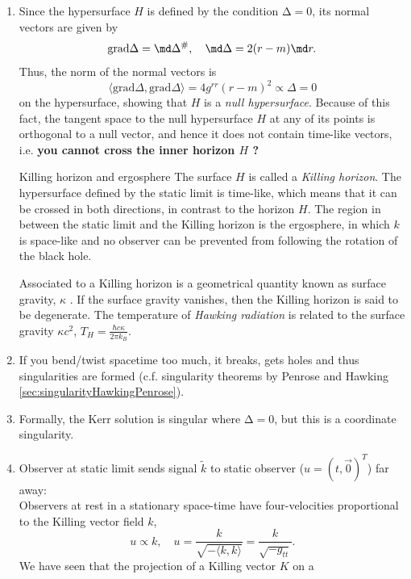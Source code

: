 \begin{enumerate}
	 \item Since the hypersurface $H$ is defined by the condition $∆ = 0$, its normal
	 vectors are given by
	 \begin{equation}
	 	\mathrm{grad} \Delta = \md \Delta^{\#}, \quad \md \Delta = 2(r-m) \md r.
	 \end{equation}
Thus, the norm of the normal vectors is 
\begin{equation}
 	\langle \mathrm{grad} \Delta, \mathrm{grad} \Delta \rangle = 4 g^{rr} (r-m)^2 \propto \Delta = 0
\end{equation}
on the hypersurface, showing that $H$ is a \emph{null hypersurface}. Because of this fact, the tangent space to
the null hypersurface $H$ at any of its points is orthogonal to a null vector,
and hence it does not contain time-like vectors, i.e. \textbf{you cannot cross the inner horizon $H$ ?}
\begin{mybox}{Killing horizon and ergosphere}
	The surface $H$ is called a \emph{Killing horizon}. The hypersurface defined
	by the static limit is time-like, which means that it can be crossed in
	both directions, in contrast to the horizon $H$. The region in between
	the static limit and the Killing horizon is the ergosphere, in which $k$ is
	space-like and no observer can be prevented from following the rotation
	of the black hole.
\end{mybox}
Associated to a Killing horizon is a geometrical quantity known as surface gravity, $\kappa$ . If the surface gravity vanishes, then the Killing horizon is said to be degenerate. The temperature of \emph{Hawking radiation} is related to the surface gravity $\kappa c^2$, $T_H=\frac {\hbar c\kappa }{2\pi k_{B}}$.
\item If you bend/twist spacetime too much, it breaks, gets holes and thus singularities are formed (c.f. singularity theorems by Penrose and Hawking \ref{sec:singularityHawkingPenrose}).
\item Formally, the Kerr solution is singular where $∆ = 0$, but this is a coordinate singularity.
\item Observer at static limit sends signal $\tilde{k}$ to static observer ($u=(t,\vec{0})^T$) far away:\\
	Observers at rest in a stationary space-time have four-velocities proportional to the Killing vector field $k$,
	\begin{equation}
		u \propto k, \quad u=\frac{k}{\sqrt{-\langle k,k\rangle}} = \frac{k}{\sqrt{-g_{tt}}}.
	\end{equation}
	We have seen that the projection of a Killing vector $K$ on a

\end{enumerate}
